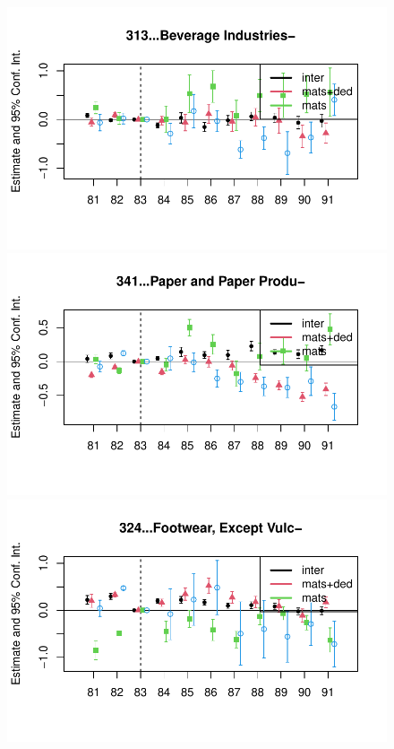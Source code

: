 \documentclass[
  12pt]{article}
\theoremstyle{definition}
\theoremstyle{remark}
\begin{document}
\begin{figure}
\begin{minipage}{\linewidth}
\includegraphics{Tax-Prod_files/figure-pdf/unnamed-chunk-11-7.pdf}

\includegraphics{Tax-Prod_files/figure-pdf/unnamed-chunk-11-8.pdf}

\includegraphics{Tax-Prod_files/figure-pdf/unnamed-chunk-11-9.pdf}


\end{minipage}
\end{figure}
\end{document}
